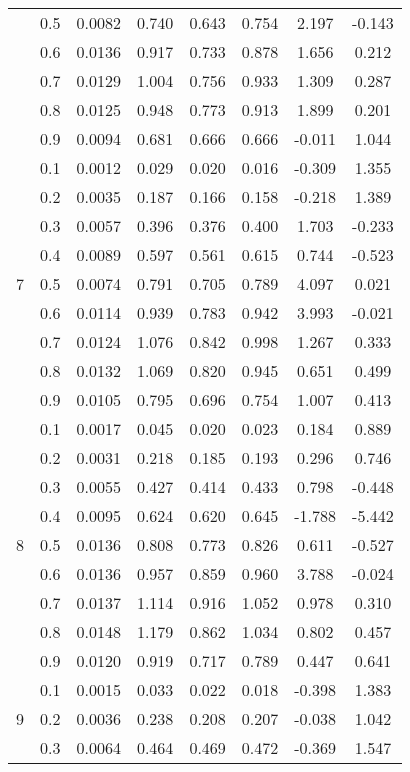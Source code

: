 \documentclass[11pt,a4paper]{report}
\begin{document}
\begin{longtable}{ | c | c || c | c | c | c | c | c | }
 & 0.5 & 0.0082 & 0.740 & 0.643 & 0.754 & 2.197 & -0.143 \\
 & 0.6 & 0.0136 & 0.917 & 0.733 & 0.878 & 1.656 & 0.212 \\
 & 0.7 & 0.0129 & 1.004 & 0.756 & 0.933 & 1.309 & 0.287 \\
 & 0.8 & 0.0125 & 0.948 & 0.773 & 0.913 & 1.899 & 0.201 \\
 & 0.9 & 0.0094 & 0.681 & 0.666 & 0.666 & -0.011 & 1.044 \\
 \hline
\multirow{9}{*}{7} & 0.1 & 0.0012 & 0.029 & 0.020 & 0.016 & -0.309 & 1.355 \\
 & 0.2 & 0.0035 & 0.187 & 0.166 & 0.158 & -0.218 & 1.389 \\
 & 0.3 & 0.0057 & 0.396 & 0.376 & 0.400 & 1.703 & -0.233 \\
 & 0.4 & 0.0089 & 0.597 & 0.561 & 0.615 & 0.744 & -0.523 \\
 & 0.5 & 0.0074 & 0.791 & 0.705 & 0.789 & 4.097 & 0.021 \\
 & 0.6 & 0.0114 & 0.939 & 0.783 & 0.942 & 3.993 & -0.021 \\
 & 0.7 & 0.0124 & 1.076 & 0.842 & 0.998 & 1.267 & 0.333 \\
 & 0.8 & 0.0132 & 1.069 & 0.820 & 0.945 & 0.651 & 0.499 \\
 & 0.9 & 0.0105 & 0.795 & 0.696 & 0.754 & 1.007 & 0.413 \\
 \hline
\multirow{9}{*}{8} & 0.1 & 0.0017 & 0.045 & 0.020 & 0.023 & 0.184 & 0.889 \\
 & 0.2 & 0.0031 & 0.218 & 0.185 & 0.193 & 0.296 & 0.746 \\
 & 0.3 & 0.0055 & 0.427 & 0.414 & 0.433 & 0.798 & -0.448 \\
 & 0.4 & 0.0095 & 0.624 & 0.620 & 0.645 & -1.788 & -5.442 \\
 & 0.5 & 0.0136 & 0.808 & 0.773 & 0.826 & 0.611 & -0.527 \\
 & 0.6 & 0.0136 & 0.957 & 0.859 & 0.960 & 3.788 & -0.024 \\
 & 0.7 & 0.0137 & 1.114 & 0.916 & 1.052 & 0.978 & 0.310 \\
 & 0.8 & 0.0148 & 1.179 & 0.862 & 1.034 & 0.802 & 0.457 \\
 & 0.9 & 0.0120 & 0.919 & 0.717 & 0.789 & 0.447 & 0.641 \\
 \hline
\multirow{9}{*}{9} & 0.1 & 0.0015 & 0.033 & 0.022 & 0.018 & -0.398 & 1.383 \\
 & 0.2 & 0.0036 & 0.238 & 0.208 & 0.207 & -0.038 & 1.042 \\
 & 0.3 & 0.0064 & 0.464 & 0.469 & 0.472 & -0.369 & 1.547 \\

\end{longtable}
\end{document}
